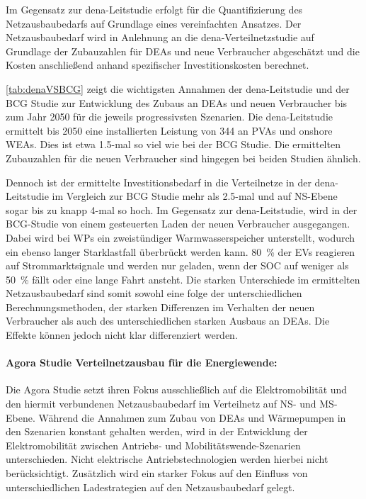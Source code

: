 Im Gegensatz zur dena-Leitstudie erfolgt für die Quantifizierung des Netzausbaubedarfs auf Grundlage eines vereinfachten Ansatzes.
Der Netzausbaubedarf wird in Anlehnung an die dena-Verteilnetzstudie \cite{DEAGH2012} auf Grundlage der Zubauzahlen für \glspl{DEA} und neue Verbraucher abgeschätzt und die Kosten anschließend anhand spezifischer Investitionskosten berechnet.



\autoref{tab:denaVSBCG} zeigt die wichtigsten Annahmen der dena-Leitstudie und der BCG Studie zur Entwicklung des Zubaus an \glspl{DEA} und neuen Verbraucher bis zum Jahr \num{2050} für die jeweils progressivsten Szenarien.
Die dena-Leitstudie ermittelt bis \num{2050} eine installierten Leistung von \SI{344}{\gw} an \glspl{PVA} und onshore \glspl{WEA}.
Dies ist etwa  \num{1.5}-mal so viel wie bei der BCG Studie.
Die ermittelten Zubauzahlen für die neuen Verbraucher sind hingegen bei beiden Studien ähnlich.\medskip

Dennoch ist der ermittelte Investitionsbedarf in die Verteilnetze in der dena-Leitstudie im Vergleich zur BCG Studie mehr als \num{2.5}-mal und auf \gls{NS}-Ebene sogar bis zu knapp \num{4}-mal so hoch.
Im Gegensatz zur dena-Leitstudie, wird in der BCG-Studie von einem gesteuerten Laden der neuen Verbraucher ausgegangen.
Dabei wird bei \glspl{WP} ein zweistündiger Warmwasserspeicher unterstellt, wodurch ein ebenso langer Starklastfall überbrückt werden kann.
\SI{80}{\percent} der \glspl{EV} reagieren auf Strommarktsignale und werden nur geladen, wenn der \gls{SOC} auf weniger als \SI{50}{\percent} fällt oder eine lange Fahrt ansteht.
Die starken Unterschiede im ermittelten Netzausbaubedarf sind somit sowohl eine folge der unterschiedlichen Berechnungsmethoden, der starken Differenzen im Verhalten der neuen Verbraucher als auch des unterschiedlichen starken Ausbaus an \glspl{DEA}.
Die Effekte können jedoch nicht klar differenziert werden.

\paragraph{Agora Studie \glqq Verteilnetzausbau für die Energiewende\grqq:}

Die Agora Studie setzt ihren Fokus ausschließlich auf die Elektromobilität und den hiermit verbundenen Netzausbaubedarf im Verteilnetz auf \gls{NS}- und \gls{MS}-Ebene.
Während die Annahmen zum Zubau von \glspl{DEA} und Wärmepumpen in den Szenarien konstant gehalten werden, wird in der Entwicklung der Elektromobilität zwischen Antriebs- und Mobilitätswende-Szenarien unterschieden.
Nicht elektrische Antriebstechnologien werden hierbei nicht berücksichtigt.
Zusätzlich wird ein starker Fokus auf den Einfluss von unterschiedlichen Ladestrategien auf den Netzausbaubedarf gelegt.\medskip


